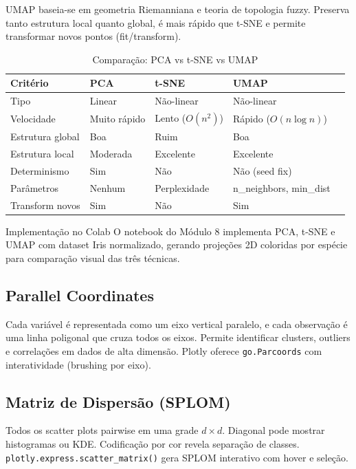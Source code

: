 \documentclass[12pt,a4paper]{article}
\begin{document}
UMAP baseia-se em geometria Riemanniana e teoria de topologia fuzzy. Preserva tanto estrutura local quanto global, é mais rápido que t-SNE e permite transformar novos pontos (fit/transform).

\begin{table}[ht]
\centering
\caption{Comparação: PCA vs t-SNE vs UMAP}
\begin{tabular}{@{}lllll@{}}
\toprule
\textbf{Critério} & \textbf{PCA} & \textbf{t-SNE} & \textbf{UMAP} \\
\midrule
Tipo & Linear & Não-linear & Não-linear \\
Velocidade & Muito rápido & Lento ($O(n^2)$) & Rápido ($O(n \log n)$) \\
Estrutura global & Boa & Ruim & Boa \\
Estrutura local & Moderada & Excelente & Excelente \\
Determinismo & Sim & Não & Não (seed fix) \\
Parâmetros & Nenhum & Perplexidade & n\_neighbors, min\_dist \\
Transform novos & Sim & Não & Sim \\
\bottomrule
\end{tabular}
\end{table}

\begin{dicabox}{Implementação no Colab}
O notebook do Módulo 8 implementa PCA, t-SNE e UMAP com dataset Iris normalizado, gerando projeções 2D coloridas por espécie para comparação visual das três técnicas.
\end{dicabox}

\subsection{Parallel Coordinates}

Cada variável é representada como um eixo vertical paralelo, e cada observação é uma linha poligonal que cruza todos os eixos. Permite identificar clusters, outliers e correlações em dados de alta dimensão. Plotly oferece \texttt{go.Parcoords} com interatividade (brushing por eixo).

\subsection{Matriz de Dispersão (SPLOM)}

Todos os scatter plots pairwise em uma grade $d \times d$. Diagonal pode mostrar histogramas ou KDE. Codificação por cor revela separação de classes. \texttt{plotly.express.scatter\_matrix()} gera SPLOM interativo com hover e seleção.
\end{document}
